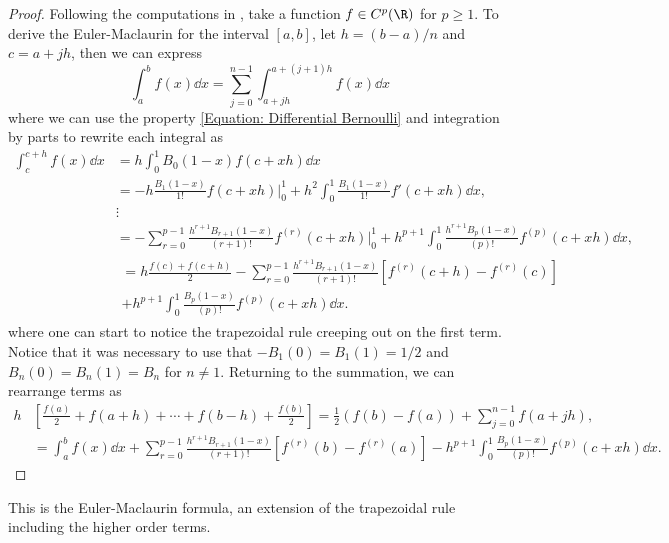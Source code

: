 \begin{proof}
Following the computations in \cite{Trapezoidal-Maclaurin}, take a function $f \in C^p(\R)$ for $p \geq 1$. To derive the Euler-Maclaurin for the interval $[a,b]$, let $h = (b - a)/n$ and $c = a + j h$, then we can express
\begin{equation}
	\int_{a}^{b} f(x) \dd x = \sum_{j=0}^{n-1} \int_{a+j h}^{a+(j+1)h} f(x) \dd x
\end{equation}
where we can use the property \eqref{Equation: Differential Bernoulli} and integration by parts to rewrite each integral as
\begin{align}
	\int_{c}^{c+h} f(x) \dd x & = h \int_{0}^{1} B_0(1-x) f(c+xh) \dd x \\
	& = - h \frac{B_1(1-x)}{1!} f(c + xh) |_0^1 + h^2 \int_{0}^{1} \frac{B_1(1-x)}{1!} f'(c+xh) \dd x, \\
	& \vdots \nonumber \\
	& = - \sum_{r = 0}^{p-1} \frac{h^{r+1} B_{r+1}(1-x)}{(r+1)!} f^{(r)}(c+xh) |_0^1 + h^{p+1} \int_0^1 \frac{h^{r+1} B_{p}(1-x)}{(p)!} f^{(p)}(c+xh) \dd x, \\
	& 
	\begin{multlined}
		= h \frac{f(c) + f(c+h)}{2} - \sum_{r = 0}^{p-1} \frac{h^{r+1} B_{r+1}(1-x)}{(r+1)!} \left[ f^{(r)}(c+h) - f^{(r)}(c) \right] \\
		+ h^{p+1} \int_0^1 \frac{B_{p}(1-x)}{(p)!} f^{(p)}(c+xh) \dd x. 
	\end{multlined}
\end{align}
where one can start to notice the trapezoidal rule creeping out on the first term. Notice that it was necessary to use that $ - B_1(0) = B_1(1) = 1/2$ and $B_n(0) = B_n(1) = B_n$ for $n\neq1$. Returning to the summation, we can rearrange terms as
\begin{align}
	h & \left[ \frac{f(a)}{2} + f(a+h) + \cdots + f(b-h) + \frac{f(b)}{2} \right] = \frac{1}{2} (f(b) - f(a)) + \sum_{j=0}^{n-1} f(a + j h), \\
	& = \int_{a}^{b} f(x) \dd x + \sum_{r = 0}^{p-1} \frac{h^{r+1} B_{r+1}(1-x)}{(r+1)!} \left[ f^{(r)}(b) - f^{(r)}(a) \right] - h^{p+1} \int_0^1 \frac{B_{p}(1-x)}{(p)!} f^{(p)}(c+xh) \dd x. 
\end{align}
\end{proof}
This is the Euler-Maclaurin formula, an extension of the trapezoidal rule including the higher order terms.

